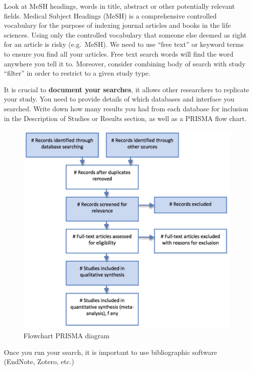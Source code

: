 \documentclass[
]{book}
\begin{document}
Look at MeSH headings, words in title, abstract or other potentially relevant fields. Medical Subject Headings (MeSH) is a comprehensive controlled vocabulary for the purpose of indexing journal articles and books in the life sciences. Using only the controlled vocabulary that someone else deemed as right for an article is risky (e.g.~MeSH). We need to use ``free text'' or keyword terms to ensure you find all your articles. Free text search words will find the word anywhere you tell it to. Moreover, consider combining body of search with study ``filter'' in order to restrict to a given study type.

It is crucial to \textbf{document your searches}, it allows other researchers to replicate your study. You need to provide details of which databases and interface you searched. Write down how many results you had from each database for inclusion in the Description of Studies or Results section, as well as a PRISMA flow chart.

\begin{figure}

{\centering \includegraphics[width=13.46in]{images/PRISMA_flow_diagram} 

}

\caption{Flowchart PRISMA diagram}\label{fig:unnamed-chunk-1}
\end{figure}

Once you run your search, it is important to use bibliographic software (EndNote, Zotero, etc.)
\end{document}

